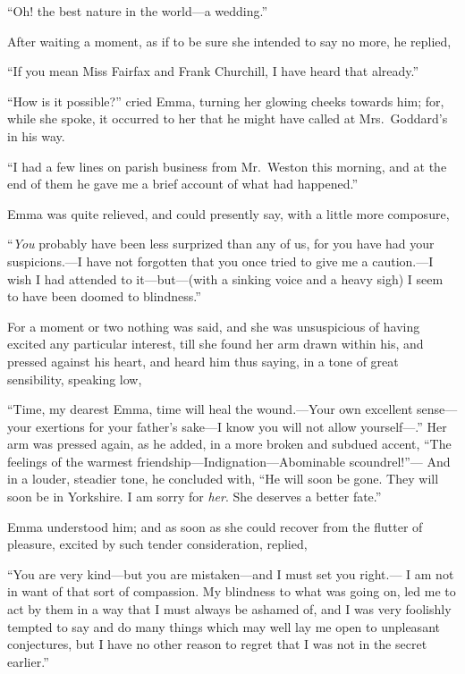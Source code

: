 ``Oh! the best nature in the world---a wedding.''

After waiting a moment, as if to be sure she intended to say no more,
he replied,

``If you mean Miss Fairfax and Frank Churchill, I have heard
that already.''

``How is it possible?'' cried Emma, turning her glowing cheeks
towards him; for, while she spoke, it occurred to her that he
might have called at Mrs.\ Goddard's in his way.

``I had a few lines on parish business from Mr.\ Weston this morning,
and at the end of them he gave me a brief account of what had happened.''

Emma was quite relieved, and could presently say, with a little
more composure,

``\emph{You} probably have been less surprized than any of us, for you have
had your suspicions.---I have not forgotten that you once tried to give
me a caution.---I wish I had attended to it---but---(with a sinking
voice and a heavy sigh) I seem to have been doomed to blindness.''

For a moment or two nothing was said, and she was unsuspicious
of having excited any particular interest, till she found her arm
drawn within his, and pressed against his heart, and heard him
thus saying, in a tone of great sensibility, speaking low,

``Time, my dearest Emma, time will heal the wound.---Your own
excellent sense---your exertions for your father's sake---I know
you will not allow yourself---.''  Her arm was pressed again,
as he added, in a more broken and subdued accent, ``The feelings
of the warmest friendship---Indignation---Abominable scoundrel!''---%
And in a louder, steadier tone, he concluded with, ``He will soon
be gone.  They will soon be in Yorkshire.  I am sorry for \emph{her}.
She deserves a better fate.''

Emma understood him; and as soon as she could recover from the
flutter of pleasure, excited by such tender consideration, replied,

``You are very kind---but you are mistaken---and I must set you right.---%
I am not in want of that sort of compassion.  My blindness to what
was going on, led me to act by them in a way that I must always
be ashamed of, and I was very foolishly tempted to say and do many
things which may well lay me open to unpleasant conjectures, but I
have no other reason to regret that I was not in the secret earlier.''


